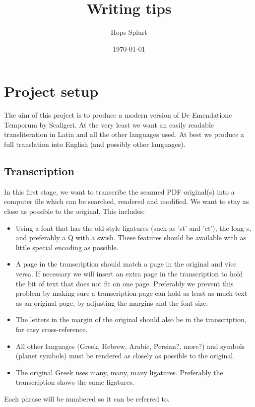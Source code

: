 \documentclass{report}
\title{Writing tips}
\author{Hops Splurt}
\date{\today}                                           %
\begin{document}
\maketitle




\chapter{Project setup}
The aim of this project is to produce a modern version of De Emendatione Temporum by Scaligeri. At the very
least we want an easily readable transliteration in Latin and all the other languages used. At best we produce
a full translation into English (and possibly other languages).

\section{Transcription}
In this first stage, we want to transcribe the scanned PDF original(s) into a computer file which can be searched, rendered
and modified. We want to stay as close as possible to the original. This includes:
\begin{itemize}
\item Using a font that has the old-style ligatures (such as 'st' and 'ct'), the long s, and preferably a Q with a swish. These
features should be available with as little special encoding as possible.
\item A page in the transcription should match a page in the original and vice versa. If necessary we will insert an
extra page in the transcription to hold the bit of text that does not fit on one page. Preferably we prevent this problem
by making sure a transcription page can hold as least as much text as an original page, by adjusting the margins
and the font size.
\item The letters in the margin of the original should also be in the transcription, for easy cross-reference.
\item All other languages (Greek, Hebrew, Arabic, Persian?, more?) and symbols (planet symbols) must be rendered
as closely as possible to the original.
\item The original Greek uses many, many, many ligatures. Preferably the transcription shows the same ligatures.
\end{itemize}
Each phrase will be numbered so it can be referred to.
\end{document}
